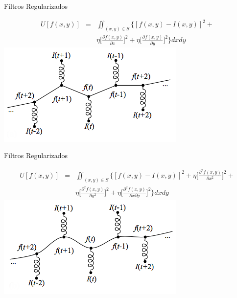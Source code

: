 \documentclass[]{beamer}
\begin{document}
\begin{frame}{Filtros Regularizados}
\begin{center}

\begin{eqnarray}
  U[f(x,y)] &=&\iint_{(x,y) \in S} \Bigg\{ [f(x,y)-I(x,y)]^2 +  \nonumber \\
     & & \eta \bigg[  \frac{\partial f(x,y)}{\partial x} \bigg]^2 +
            \eta \bigg[  \frac{\partial f(x,y)}{\partial y} \bigg]^2 
     \Bigg\} dx dy
\end{eqnarray}
\pause \includegraphics[scale=0.6]{Images/RegularizadosResorte.png}

\end{center}
\end{frame}
\begin{frame}{Filtros Regularizados}
\begin{center}

\begin{eqnarray}
  U[f(x,y)] &=&\iint_{(x,y) \in S} \Bigg\{ [f(x,y)-I(x,y)]^2 + 
     \eta \bigg[  \frac{\partial ^2 f(x,y)}{\partial x^2} \bigg]^2 +
                \nonumber \\
      & &\eta \bigg[  \frac{\partial ^2 f(x,y)}{\partial y^2} \bigg]^2 +
     \eta \bigg[  \frac{\partial ^2 f(x,y)}{\partial x \partial y} \bigg]^2
     \Bigg\} dx dy
\end{eqnarray}
\pause \includegraphics[scale=0.6]{Images/RegularizadosPlaca.png}

\end{center}
\end{frame}
\end{document}
